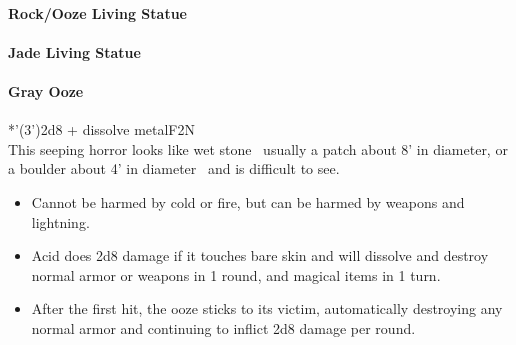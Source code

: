 \documentclass[english,11pt,openany,letterpaper,twocolumn]{book}
\begin{document}
\paragraph{Rock/Ooze Living Statue}
\vspace*{-\baselineskip}
\paragraph{Jade Living Statue}



\hypertarget{gray-ooze}{}
\paragraph{Gray Ooze}
*'(3')\tab 2d8 + dissolve metal\tab F2\tab N\\

This seeping horror looks like wet stone \dash\ usually a patch about 8' in diameter, or a boulder about 4' in diameter \dash\ and is difficult to see.

\begin{itemize}[leftmargin=*,label=\itshape\textbullet]
	\item
	Cannot be harmed by cold or fire, but can be harmed by weapons and lightning.
	\item
	Acid does 2d8 damage if it touches bare skin and will dissolve and destroy normal armor or weapons in 1 round, and magical items in 1 turn.
	\item
	After the first hit, the ooze sticks to its victim, automatically destroying any normal armor and continuing to inflict 2d8 damage per round.
\end{itemize}
\end{document}

